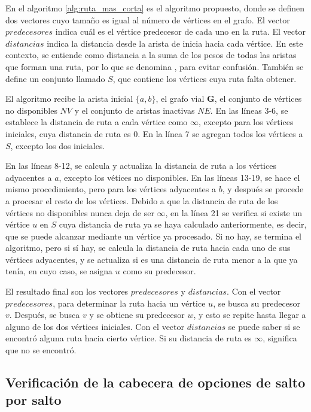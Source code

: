 En el algoritmo \ref{alg:ruta_mas_corta} es el algoritmo propuesto, donde se
definen dos vectores cuyo tamaño es igual al número de vértices en el grafo. El
vector $predecesores$ indica cuál es el vértice predecesor de cada uno en la
ruta. El vector $distancias$ indica la distancia desde la arista de inicia
hacia cada vértice. En este contexto, se entiende como distancia a la suma de
los pesos de todas las aristas que forman una ruta, por lo que se denomina
, para evitar confusión. También se define un
conjunto llamado $S$, que contiene los vértices cuya ruta falta obtener.

El algoritmo recibe la arista inicial $\{a,b\}$, el grafo vial $\mathbf{G}$,
el conjunto de vértices no disponibles $NV$ y el conjunto de aristas inactivas
$NE$. En las líneas 3-6, se establece la distancia de ruta a cada vértice como
$\infty$, excepto para los vértices iniciales, cuya distancia de ruta es 0. En
la línea 7 se agregan todos los vértices a $S$, excepto los dos iniciales.

En las líneas 8-12, se calcula y actualiza la distancia de ruta a los vértices
adyacentes a $a$, excepto los vétices no disponibles. En las líneas 13-19, se
hace el mismo procedimiento, pero para los vértices adyacentes a $b$, y después
se procede a procesar el resto de los vértices. Debido a que la distancia de
ruta de los vértices no disponibles nunca deja de ser $\infty$, en la línea 21
se verifica si existe un vértice $u$ en $S$ cuya distancia de ruta ya se haya
calculado anteriormente, es decir, que se puede alcanzar mediante un vértice ya
procesado. Si no hay, se termina el algoritmo, pero si sí hay, se calcula la
distancia de ruta hacia cada uno de sus vértices adyacentes, y se actualiza si
es una distancia de ruta menor a la que ya tenía, en cuyo caso, se asigna $u$
como su predecesor.

El resultado final son los vectores $predecesores$ y $distancias$. Con el
vector $predecesores$, para determinar la ruta hacia un vértice $u$, se busca
su predecesor $v$. Después, se busca $v$ y se obtiene su predecesor $w$, y esto
se repite hasta llegar a alguno de los dos vértices iniciales. Con el vector
$distancias$ se puede saber si se encontró alguna ruta hacia cierto vértice. Si
su distancia de ruta es $\infty$, significa que no se encontró.

\subsection{Verificación de la cabecera de opciones de salto por salto}

